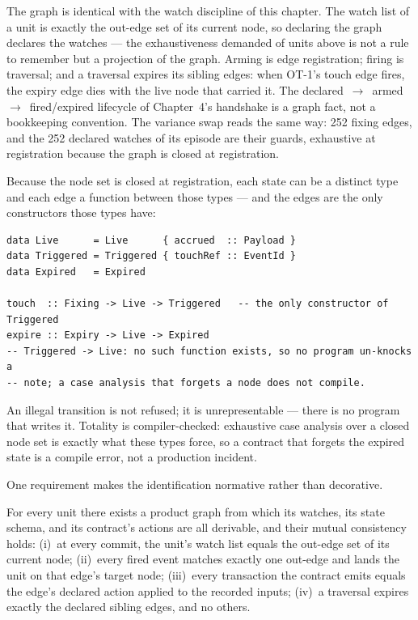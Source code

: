 The graph is identical with the watch discipline of this chapter. The watch list of a
unit is exactly the out-edge set of its current node, so declaring the graph declares
the watches --- the exhaustiveness demanded of units above is not a rule to remember but
a projection of the graph. Arming is edge registration; firing is traversal; and a
traversal expires its sibling edges: when OT-1's touch edge fires, the expiry edge dies
with the live node that carried it. The declared~$\to$~armed~$\to$~fired/expired
lifecycle of Chapter~4's handshake is a graph fact, not a bookkeeping convention. The
variance swap reads the same way: 252 fixing edges, and the 252 declared watches of its
episode are their guards, exhaustive at registration because the graph is closed at
registration.

Because the node set is closed at registration, each state can be a distinct type and
each edge a function between those types --- and the edges are the only constructors
those types have:

\begin{lstlisting}
data Live      = Live      { accrued  :: Payload }
data Triggered = Triggered { touchRef :: EventId }
data Expired   = Expired

touch  :: Fixing -> Live -> Triggered   -- the only constructor of Triggered
expire :: Expiry -> Live -> Expired
-- Triggered -> Live: no such function exists, so no program un-knocks a
-- note; a case analysis that forgets a node does not compile.
\end{lstlisting}

An illegal transition is not refused; it is unrepresentable --- there is no program that
writes it. Totality is compiler-checked: exhaustive case analysis over a closed node set
is exactly what these types force, so a contract that forgets the expired state is a
compile error, not a production incident.

One requirement makes the identification normative rather than decorative.

\begin{invariant}\label{inv:graph-consistency}
For every unit there exists a product graph from which its watches, its state schema,
and its contract's actions are all derivable, and their mutual consistency holds:
(i)~at every commit, the unit's watch list equals the out-edge set of its current node;
(ii)~every fired event matches exactly one out-edge and lands the unit on that edge's
target node;
(iii)~every transaction the contract emits equals the edge's declared action applied to
the recorded inputs;
(iv)~a traversal expires exactly the declared sibling edges, and no others.
\end{invariant}

